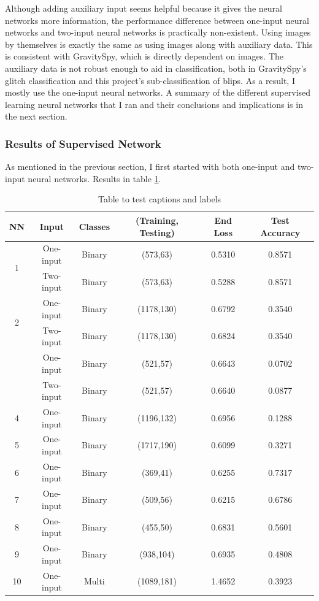 \documentclass[a4paper]{article}
\begin{document}
Although adding auxiliary input seems helpful because it gives the neural networks more information, the performance difference between one-input neural networks and two-input neural networks is practically non-existent. Using images by themselves is exactly the same as using images along with auxiliary data. This is consistent with GravitySpy, which is directly dependent on images. The auxiliary data is not robust enough to aid in classification, both in GravitySpy's glitch classification and this project's sub-classification of blips. As a result, I mostly use the one-input neural networks. A summary of the different supervised learning neural networks that I ran and their conclusions and implications is in the next section.

\subsubsection{Results of Supervised Network}

As mentioned in the previous section, I first started with both one-input and two-input neural networks. Results in table \ref{table:1}.


\begin{table}[h!]
\centering
\begin{tabular}{||c c c c c c||} 
 \hline
 NN & Input & Classes & (Training, Testing) & End Loss & Test Accuracy \\ [0.5ex] 
 \hline\hline
 \multirow{2}{*}{\hfil 1} & One-input & Binary & (573,63) & 0.5310 & 0.8571 \\ 
  & Two-input & Binary & (573,63) & 0.5288 & 0.8571 \\ 
  \multirow{2}{*}{\hfil 2} & One-input & Binary & (1178,130) & 0.6792 & 0.3540 \\ 
  & Two-input & Binary & (1178,130) & 0.6824 & 0.3540 \\
 \rowcolor{pink}
  & One-input & Binary & (521,57) & 0.6643 & 0.0702 \\
  \rowcolor{pink}
 \multirow{-2}{*}{\hfil 3}& Two-input & Binary & (521,57) & 0.6640 & 0.0877 \\
 4 & One-input & Binary & (1196,132) & 0.6956 & 0.1288 \\
 5 & One-input & Binary & (1717,190) & 0.6099 & 0.3271 \\
 6 & One-input & Binary & (369,41) & 0.6255 & 0.7317 \\
 7 & One-input & Binary & (509,56) & 0.6215 & 0.6786 \\
 8 & One-input & Binary & (455,50) & 0.6831 & 0.5601 \\
 9 & One-input & Binary & (938,104) & 0.6935 & 0.4808 \\
 \rowcolor{pink}
 10 & One-input & Multi & (1089,181) & 1.4652 & 0.3923 \\
 \hline
\end{tabular}
\caption{Table to test captions and labels}
\label{table:1}
\end{table}
\end{document}

